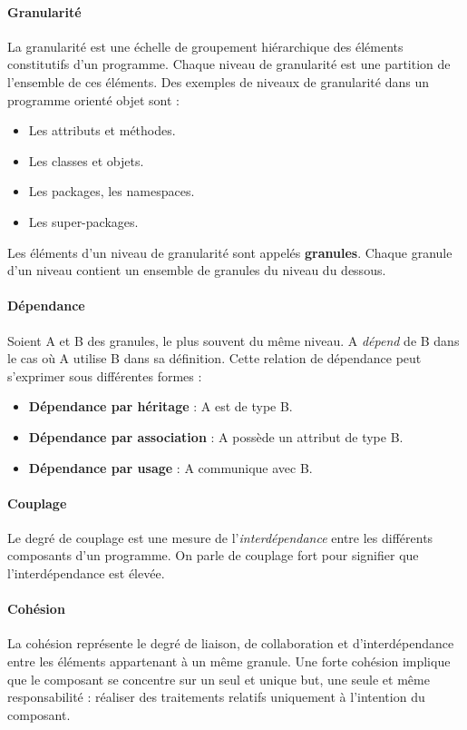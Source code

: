 \documentclass{scrartcl}
\begin{document}
    \paragraph{Granularité}La granularité est une échelle de groupement hiérarchique des éléments constitutifs d'un programme. Chaque niveau de granularité est une partition de l'ensemble de ces éléments. Des exemples de niveaux de granularité dans un programme orienté objet sont :
    \begin{itemize}
        \item Les attributs et méthodes.
        \item Les classes et objets.
        \item Les packages, les namespaces.
        \item Les super-packages.
    \end{itemize}
    Les éléments d'un niveau de granularité sont appelés \textbf{granules}. Chaque granule d'un niveau contient un ensemble de granules du niveau du dessous.
    
    \paragraph{Dépendance}Soient A et B des granules, le plus souvent du même niveau. A \emph{dépend} de B dans le cas où A utilise B dans sa définition. Cette relation de dépendance peut s'exprimer sous différentes formes :
    \begin{itemize}
        \item \textbf{Dépendance par héritage} : A est de type B.
        \item \textbf{Dépendance par association} : A possède un attribut de type B.
        \item \textbf{Dépendance par usage} : A communique avec B. 
    \end{itemize}

    \paragraph{Couplage}Le degré de couplage est une mesure de l'\emph{interdépendance} entre les différents composants d'un programme. On parle de couplage fort pour signifier que l'interdépendance est élevée.

    \paragraph{Cohésion}La cohésion représente le degré de liaison, de collaboration et d'interdépendance entre les éléments appartenant à un même granule. Une forte cohésion implique que le composant se concentre sur un seul et unique but, une seule et même responsabilité : réaliser des traitements relatifs uniquement à l’intention du composant.
    
\end{document}
